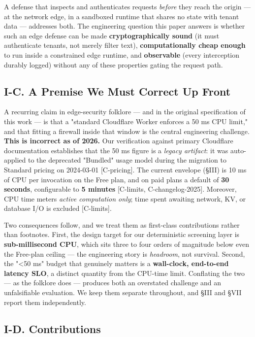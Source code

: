 A defense that inspects and authenticates requests \emph{before} they
reach the origin --- at the network edge, in a sandboxed runtime that
shares no state with tenant data --- addresses both. The engineering
question this paper answers is whether such an edge defense can be made
\textbf{cryptographically sound} (it must authenticate tenants, not
merely filter text), \textbf{computationally cheap enough} to run inside
a constrained edge runtime, and \textbf{observable} (every interception
durably logged) without any of these properties gating the request path.

\subsection{I-C. A Premise We Must Correct Up
Front}\label{i-c-a-premise-we-must-correct-up-front}

A recurring claim in edge-security folklore --- and in the original
specification of this work --- is that a "standard Cloudflare Worker
enforces a 50 ms CPU limit," and that fitting a firewall inside that
window is the central engineering challenge. \textbf{This is incorrect
as of 2026.} Our verification against primary Cloudflare documentation
establishes that the 50 ms figure is a \emph{legacy artifact}: it was
auto-applied to the deprecated "Bundled" usage model during the
migration to Standard pricing on 2024-03-01 {[}C-pricing{]}. The current
envelope (§III) is 10 ms of CPU per invocation on the Free plan, and on
paid plans a default of \textbf{30 seconds}, configurable to \textbf{5
minutes} {[}C-limits, C-changelog-2025{]}. Moreover, CPU time meters
\emph{active computation only}; time spent awaiting network, KV, or
database I/O is excluded {[}C-limits{]}.

Two consequences follow, and we treat them as first-class contributions
rather than footnotes. First, the design target for our deterministic
screening layer is \textbf{sub-millisecond CPU}, which sits three to
four orders of magnitude below even the Free-plan ceiling --- the
engineering story is \emph{headroom}, not survival. Second, the
"\textless50 ms" budget that genuinely matters is a \textbf{wall-clock,
end-to-end latency SLO}, a distinct quantity from the CPU-time limit.
Conflating the two --- as the folklore does --- produces both an
overstated challenge and an unfalsifiable evaluation. We keep them
separate throughout, and §III and §VII report them independently.

\subsection{I-D. Contributions}\label{i-d-contributions}

